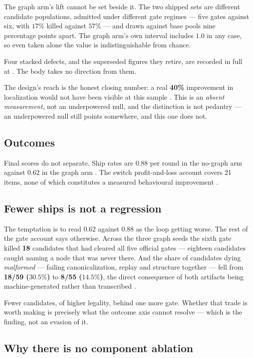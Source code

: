 The graph arm's lift cannot be set beside it. The two shipped sets are
different candidate populations, admitted under different gate regimes ---
five gates against six, with $17\%$ killed against $57\%$ --- and drawn
against base pools nine percentage points apart. The graph arm's own
interval includes $1.0$ in any case, so even taken alone the value is
indistinguishable from chance.

Four stacked defects, and the superseded figures they retire, are recorded
in full at . The body takes no direction from them.

The design's reach is the honest closing number: a real \textbf{40\%}
improvement in localization would not have been visible at this sample
. This is an \emph{absent measurement}, not an underpowered null, and
the distinction is not pedantry --- an underpowered null still points
somewhere, and this one does not.

\subsection*{Outcomes}

Final scores do not separate. Ship rates are $0.88$ per round in the
no-graph arm against $0.62$ in the graph arm . The switch
profit-and-loss account covers 21 items, none of which constitutes a measured
behavioural improvement .

\subsection*{Fewer ships is not a regression}

The temptation is to read $0.62$ against $0.88$ as the loop getting worse.
The rest of the gate account says otherwise. Across the three graph seeds
the sixth gate killed \textbf{18} candidates that had cleared all five
official gates --- eighteen candidates caught naming a node that was never
there. And the share of candidates dying \emph{malformed} --- failing
canonicalization, replay and structure together --- fell from
\textbf{18/59 ($30.5\%$)} to \textbf{8/55 ($14.5\%$)}, the direct
consequence of both artifacts being machine-generated rather than
transcribed .

Fewer candidates, of higher legality, behind one more gate. Whether that
trade is worth making is precisely what the outcome axis cannot resolve ---
which is the finding, not an evasion of it.

\subsection*{Why there is no component ablation}

